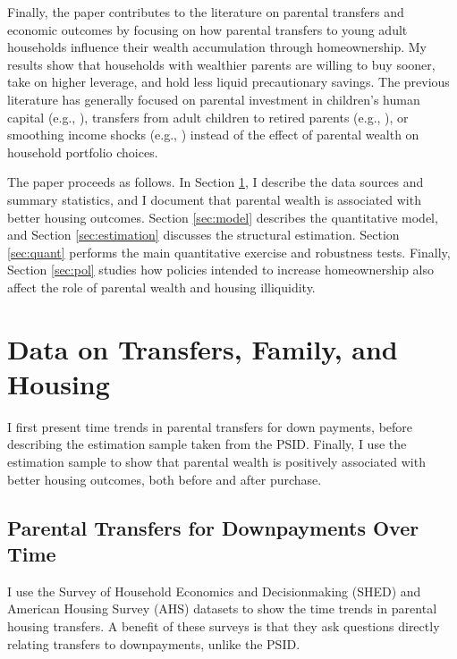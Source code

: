 \documentclass[12pt]{article}
\begin{document}
Finally, the paper contributes to the literature on parental transfers and economic outcomes by focusing on how parental transfers to young adult households influence their wealth accumulation through homeownership. My results show that households with wealthier parents are willing to buy sooner, take on higher leverage, and hold less liquid precautionary savings. The previous literature has generally focused on parental investment in children's human capital (e.g., \citealp{Lee2019,Daruich2018,gilraine2023public}), transfers from adult children to retired parents (e.g., \citealp{Mommaerts2016, Barczyk2018, Barczyk2020a}), or smoothing income shocks (e.g., \cite{Boar2021ReStud,fagereng2023insuring,andersen2020bailing}) instead of the effect of parental wealth on household portfolio choices.

The paper proceeds as follows. In Section \ref{sec:data}, I describe the data sources and summary statistics, and I document that parental wealth is associated with better housing outcomes. Section \ref{sec:model} describes the quantitative model, and Section \ref{sec:estimation} discusses the structural estimation. Section \ref{sec:quant} performs the main quantitative exercise and robustness tests. Finally, Section \ref{sec:pol} studies how policies intended to increase homeownership also affect the role of parental wealth and housing illiquidity.

\section{Data on Transfers, Family, and Housing}\label{sec:data}
I first present time trends in parental transfers for down payments, before describing the estimation sample taken from the PSID. Finally, I use the estimation sample to show that parental wealth is positively associated with better housing outcomes, both before and after purchase.

\subsection{Parental Transfers for Downpayments Over Time}\label{sec:overtime}
I use the Survey of Household Economics and Decisionmaking (SHED) and American Housing Survey (AHS) datasets to show the time trends in parental housing transfers. A benefit of these surveys is that they ask questions directly relating transfers to downpayments, unlike the PSID. 
\end{document}
